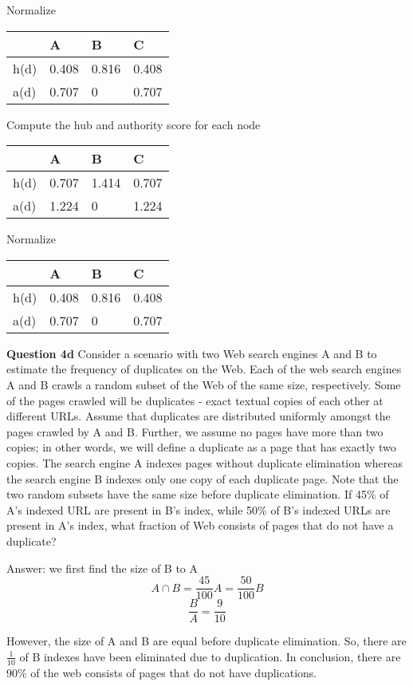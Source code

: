 \documentclass[11pt,a4paper]{report}
\begin{document}
\begin{multicols*}{2}
\noindent Normalize
\begin{center}
\begin{tabular}{ |l|l|l|l| } 
    \hline
         & A     & B     & C \\
    \hline 
    h(d) & 0.408 & 0.816 & 0.408 \\
    a(d) & 0.707 & 0     & 0.707 \\
    \hline
\end{tabular}
\end{center}

\noindent Compute the hub and authority score for each node
\begin{center}
\begin{tabular}{ |l|l|l|l| } 
    \hline
         & A     & B     & C \\
    \hline 
    h(d) & 0.707 & 1.414 & 0.707 \\
    a(d) & 1.224 & 0     & 1.224 \\
    \hline
\end{tabular}
\end{center} 

\noindent Normalize
\begin{center}
\begin{tabular}{ |l|l|l|l| } 
    \hline
         & A     & B     & C \\
    \hline 
    h(d) & 0.408 & 0.816 & 0.408 \\
    a(d) & 0.707 & 0     & 0.707 \\
    \hline
\end{tabular}
\end{center} 

\noindent \textbf{Question 4d} Consider a scenario with two Web search engines A and B to estimate the frequency of duplicates on the Web. Each of the web search engines A and B crawls a random subset of the Web of the same size, respectively. Some of the pages crawled will be duplicates - exact textual copies of each other at different URLs. Assume that duplicates are distributed uniformly amongst the pages crawled by A and B. Further, we assume no pages have more than two copies; in other words, we will define a duplicate as a page that has exactly two copies. The search engine A indexes pages without duplicate elimination whereas the search engine B indexes only one copy of each duplicate page. Note that the two random subsets have the same size before duplicate elimination. If 45\% of A's indexed URL are present in B's index, while 50\% of B's indexed URLs are present in A's index, what fraction of Web consists of pages that do not have a duplicate?

\noindent Answer: we first find the size of B to A
$$A\cap B = \frac{45}{100}A = \frac{50}{100}B$$
$$\frac{B}{A} = \frac{9}{10}$$

\noindent However, the size of A and B are equal before duplicate elimination. So, there are $\frac{1}{10}$ of B indexes have been eliminated due to duplication. In conclusion, there are 90\% of the web consists of pages that do not have duplications.

\end{multicols*}
\end{document}
